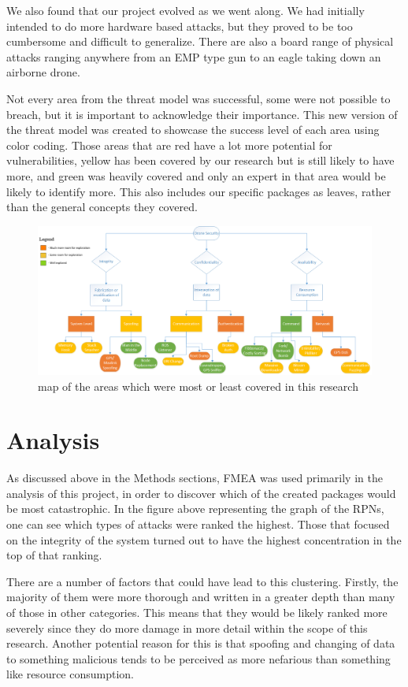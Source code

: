 \documentclass[IEEEtran,letterpaper,10pt,notitlepage,draftclsnofoot]{article}
\begin{document}
We also found that our project evolved as we went along.
We had initially intended to do more hardware based attacks, but they proved to be too cumbersome and difficult to generalize.
There are also a board range of physical attacks ranging anywhere from an EMP type gun to an eagle taking down an airborne drone.

Not every area from the threat model was successful, some were not possible to breach, but it is important to acknowledge their importance.
This new version of the threat model was created to showcase the success level of each area using color coding.
Those areas that are red have a lot more potential for vulnerabilities, yellow has been covered by our research but is still likely to have more, and green was heavily covered and only an expert in that area would be likely to identify more.
This also includes our specific packages as leaves, rather than the general concepts they covered.

\begin{figure}[H]
    \centering
    \includegraphics[width=\textwidth]{color_model.eps}
    \caption{map of the areas which were most or least covered in this research}
\end{figure}

\section{Analysis}
As discussed above in the Methods sections, FMEA was used primarily in the analysis of this project, in order to discover which of the created packages would be most catastrophic. 
In the figure above representing the graph of the RPNs, one can see which types of attacks were ranked the highest. 
Those that focused on the integrity of the system turned out to have the highest concentration in the top of that ranking.

There are a number of factors that could have lead to this clustering.
Firstly, the majority of them were more thorough and written in a greater depth than many of those in other categories.
This means that they would be likely ranked more severely since they do more damage in more detail within the scope of this research.
Another potential reason for this is that spoofing and changing of data to something malicious tends to be perceived as more nefarious than something like resource consumption.
\end{document}

